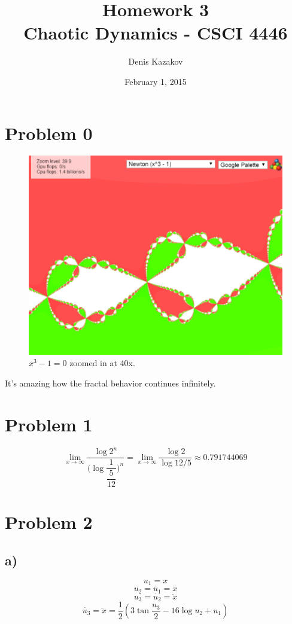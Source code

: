 \documentclass[12pt]{article}\pagestyle{myheadings}
\title{Homework 3 \\ Chaotic Dynamics - CSCI 4446}
\author{Denis Kazakov}
\date{February 1, 2015}
\theoremstyle{plain}
\begin{document}
\maketitle


\section{Problem 0}

\begin{figure}[H]
\centering
\includegraphics[scale=.4]{interesting}
\caption{$x^3 - 1 = 0$ zoomed in at 40x.}
\label{fig:my_label}
\end{figure}

It's amazing how the fractal behavior continues infinitely. 

\section{Problem 1}

$$\lim_{x\to\infty} \dfrac{\log{2^n}}{(\log{\dfrac{1}{\dfrac{5}{12}})^n}} = \lim_{x\to\infty} \dfrac{\log{2}}{\log{12/5}} \approx 0.791744069 $$

\section{Problem 2}

\subsection{a)}
$$ u_1 = x $$
$$ u_2 = \dot{u_1} = \dot{x} $$
$$ u_3 = \dot{u_2} = \ddot{x} $$
$$ \dot{u_3} = \dddot{x} = \dfrac{1}{2} (3\tan{\frac{u_3}{2}} - 16\log{u_2} + u_1) $$
\end{document}
